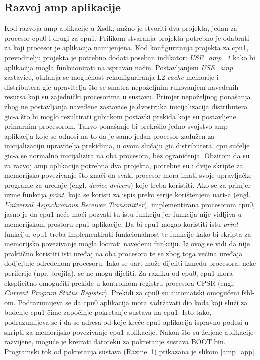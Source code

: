 \documentclass[times, utf8, diplomski, numeric]{fer}
\begin{document}
\subsection{Razvoj \gls{amp} aplikacije}
Kod razvoja \gls{amp} aplikacije u X\gls{sdk}, nužno je stvoriti dva projekta, jedan za procesor \gls{cpu}0 i drugi za \gls{cpu}1.
Prilikom stvaranja projekta potrebno je odabrati za koji procesor je aplikacija namijenjena. Kod konfiguriranja
projekta za \gls{cpu}1, prevoditelju projekta je potrebno dodati poseban indikator: \textit{USE\_\gls{amp}=1} kako bi aplikacija mogla
funkcionirati na ispravan način. Postavljanjem \textit{USE\_\gls{amp}} zastavice, otklanja se mogućnost rekonfiguriranja L2 \textit{cache}
memorije i distributera \gls{gic} upravitelja što se smatra nepoželjnim rukovanjem navedenih resursa koji su zajednički procesorima
u sustavu. Primjer nepoželjnog ponašanja zbog ne postavljanja navedene zastavice je dvostruka inicijalizacija distributera
\gls{gic}-a što bi moglo rezultirati gubitkom postavki prekida koje su postavljene primarnim procesorom. Takvo ponašanje bi
prekršilo jedno svojstvo \gls{amp} aplikacija koje se odnosi na to da je samo jedan procesor zadužen za inicijalizaciju upravitelja
prekidima, u ovom slučaju \gls{gic} distributera. \gls{cpu} sučelje \gls{gic}-a se normalno inicijalizira na oba procesora, bez ograničenja.
Obzirom da su za razvoj \gls{amp} aplikacije potrebna dva projekta, potrebne su i dvije skripte za memorijsko povezivanje što
znači da svaki procesor mora imati svoje upravljačke programe za uređaje (engl. \textit{device drivers}) koje treba koristiti.
Ako se za primjer uzme funkcija \textit{print}, koja se koristi za ispis preko serije korištenjem \gls{uart}-a (engl. \textit{Universal
Asynchronous Receiver Transmitter}), implementirana procesorom \gls{cpu}0, jasno je da \gls{cpu}1 neće moći pozvati tu istu funkciju
jer funkcija nije vidljiva u memorijskom prostoru \gls{cpu}1 aplikacije. Da bi \gls{cpu}1 mogao koristiti istu \textit{print} funkciju,
\gls{cpu}1 treba implementirati funkcionalnost te funkcije kako bi skripta za memorijsko povezivanje mogla locirati navedenu
funkciju. Iz ovog se vidi da nije praktično koristiti isti uređaj na oba procesora te se zbog toga većina uređaja dodjeljuje
određenom procesoru. Iako se \gls{uart} može dijeliti između procesora, neke periferije (npr. brojila), se ne mogu dijeliti.
Za razliku od \gls{cpu}0, \gls{cpu}1 mora eksplicitno omogućiti prekide u kontrolnom registru procesora CPSR (engl. \textit{Current
Program Status Register}). Prekidi za \gls{cpu}0 su
automatski omogućeni \gls{fsbl}-om. Podrazumijeva se da \gls{cpu}0 aplikacija mora sadržavati dio koda koji služi za buđenje \gls{cpu}1
čime započinje pokretanje sustava na \gls{cpu}1. Isto tako, podrazumijeva se i da se adresa od koje kreće \gls{cpu}1 aplikacija
ispravno podesi u skripti za memorijsko povezivanje \gls{cpu}1 aplikacije. Nakon što su željene aplikacije razvijene, moguće
je kreirati datoteku za pokretanje sustava BOOT.bin. Programski tok od pokretanja sustava (Razine~1) prikazana je slikom
\ref{amp_app}.
\end{document}

